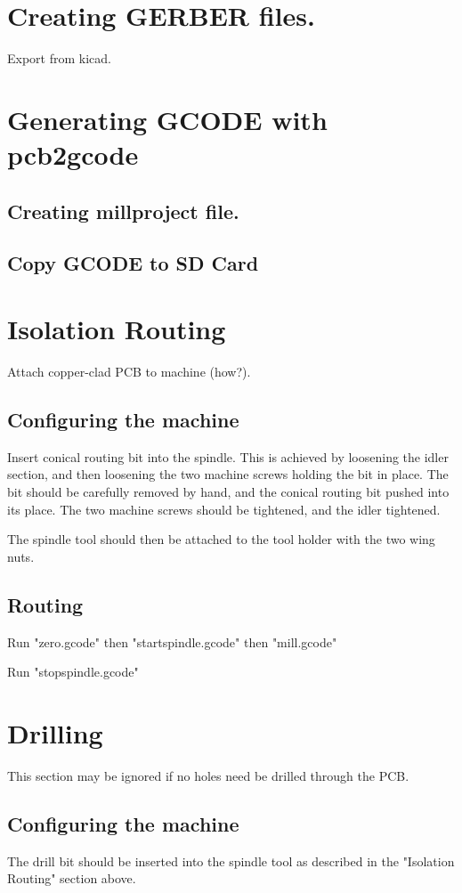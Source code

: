 \documentclass[a4paper,11pt]{article}  %
\begin{document}
\section{Creating GERBER files.}
Export from kicad.

\section{Generating GCODE with pcb2gcode}
\subsection{Creating millproject file.}

\subsection{Copy GCODE to SD Card}

\section{Isolation Routing}
Attach copper-clad PCB to machine (how?).

\subsection{Configuring the machine}
Insert conical routing bit into the spindle. This is achieved by loosening
the idler section, and then loosening the two machine screws holding the bit in place.
The bit should be carefully removed by hand, and the conical routing bit 
pushed into its place. The two machine screws should be tightened, and the idler
tightened.

The spindle tool should then be attached to the tool holder with the two
wing nuts.

\subsection{Routing}
Run "zero.gcode" then "startspindle.gcode" then "mill.gcode"

Run "stopspindle.gcode"

\section{Drilling}
This section may be ignored if no holes need be drilled through the PCB.

\subsection{Configuring the machine}
The drill bit should be inserted into the spindle tool as described in 
the "Isolation Routing" section above.
\end{document}
